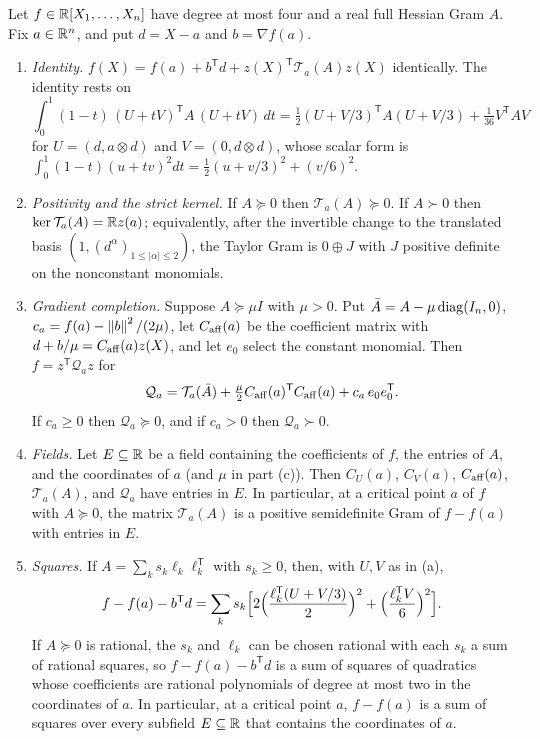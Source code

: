 \begin{lemma}
\label{lem:taylor-sos}
Let $f\in\mathbb R[X_1,\ldots,X_n]$ have degree at most four and a real full Hessian
Gram $A$. Fix $a\in\mathbb R^n$, and put $d=X-a$ and $b=\nabla f(a)$.
\begin{enumerate}[label=(\alph*)]
\item \emph{Identity.}
  $f(X)=f(a)+b^{\mathsf T}d+z(X)^{\mathsf T}\mathcal T_a(A)z(X)$ identically.
  The identity rests on
  \[
   \int_0^1(1-t)\,(U+tV)^{\mathsf T}A\,(U+tV)\,dt
   =\tfrac12(U+V/3)^{\mathsf T}A(U+V/3)+\tfrac1{36}V^{\mathsf T}AV
  \]
  for $U=(d,a\otimes d)$ and $V=(0,d\otimes d)$, whose scalar form is
  $\int_0^1(1-t)(u+tv)^2dt=\frac12(u+v/3)^2+(v/6)^2$.
\item \emph{Positivity and the strict kernel.} If $A\succeq0$ then
  $\mathcal T_a(A)\succeq0$. If $A\succ0$ then
  $\ker\mathcal T_a(A)=\mathbb R z(a)$; equivalently, after the invertible change to
  the translated basis $(1,(d^\alpha)_{1\le|\alpha|\le2})$, the Taylor Gram is
  $0\oplus J$ with $J$ positive definite on the nonconstant monomials.
\item \emph{Gradient completion.} Suppose $A\succeq\mu I$ with $\mu>0$. Put
  $\bar A=A-\mu\operatorname{diag}(I_n,0)$, $c_a=f(a)-\left\lVert b\right\rVert^2/(2\mu)$, let
  $C_{\rm aff}(a)$ be the coefficient matrix with
  $d+b/\mu=C_{\rm aff}(a)z(X)$, and let $e_0$ select the constant monomial.
  Then $f=z^{\mathsf T}\mathcal Q_a z$ for
  \begin{equation}
   \mathcal Q_a=\mathcal T_a(\bar A)
     +\tfrac\mu2C_{\rm aff}(a)^{\mathsf T}C_{\rm aff}(a)
     +c_a\,e_0e_0^{\mathsf T}.
   \label{eq:heights-completed-gram}
  \end{equation}
  If $c_a\ge0$ then $\mathcal Q_a\succeq0$, and if $c_a>0$ then
  $\mathcal Q_a\succ0$.
\item \emph{Fields.} Let $E\subseteq\mathbb R$ be a field containing the
  coefficients of $f$, the entries of $A$, and the coordinates of $a$ (and
  $\mu$ in part (c)). Then $C_U(a)$, $C_V(a)$, $C_{\rm aff}(a)$,
  $\mathcal T_a(A)$, and $\mathcal Q_a$ have entries in $E$. In particular,
  at a critical point $a$ of $f$ with $A\succeq0$, the matrix
  $\mathcal T_a(A)$ is a positive semidefinite Gram of $f-f(a)$ with entries
  in $E$.
\item \emph{Squares.} If $A=\sum_ks_k\ell_k\ell_k^{\mathsf T}$ with $s_k\ge0$,
  then, with $U,V$ as in (a),
  \[
   f-f(a)-b^{\mathsf T}d=\sum_ks_k\Bigl[2\Bigl(\frac{\ell_k^{\mathsf T}(U+V/3)}2
     \Bigr)^2+\Bigl(\frac{\ell_k^{\mathsf T}V}6\Bigr)^2\Bigr].
  \]
  If $A\succeq0$ is rational, the $s_k$ and $\ell_k$ can be chosen rational
  with each $s_k$ a sum of rational squares, so $f-f(a)-b^{\mathsf T}d$ is a
  sum of squares of quadratics whose coefficients are rational polynomials of
  degree at most two in the coordinates of $a$. In
  particular, at a critical point $a$, $f-f(a)$ is a sum of squares over every
  subfield $E\subseteq\mathbb R$ that contains the coordinates of $a$.
\end{enumerate}
\end{lemma}

